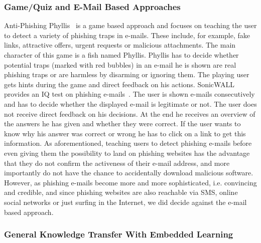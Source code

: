 \subsubsection{Game/Quiz and E-Mail Based Approaches}
Anti-Phishing Phyllis~\cite{antiphishingphyllis} is a game based approach and focuses on teaching the user to detect a variety of phishing traps in e-mails. 
These include, for example, fake links, attractive offers, urgent requests or malicious attachments. 
The main character of this game is a fish named Phyllis. 
Phyllis has to decide whether potential traps (marked with red bubbles) in an e-mail he is shown are real phishing traps or are harmless by disarming or ignoring them. 
The playing user gets hints during the game and direct feedback on his actions. 
SonicWALL provides an IQ test on phishing e-mails~\cite{sonicwall}. 
The user is shown e-mails consecutively and has to decide whether the displayed e-mail is legitimate or not. 
The user does not receive direct feedback on his decisions. 
At the end he receives an overview of the answers he has given and whether they were correct. 
If the user wants to know why his answer was correct or wrong he has to click on a link to get this information. 
As aforementioned, teaching users to detect phishing e-mails before even giving them the possibility to land on phishing websites has the advantage that they do not confirm the activeness of their e-mail address, and more importantly do not have the chance to accidentally download malicious software. 
However, as phishing e-mails become more and more sophisticated, i.e. convincing and credible, and since phishing websites are also reachable via SMS, online social networks or just surfing in the Internet, we did decide against the e-mail based approach. 

\subsubsection{General Knowledge Transfer With Embedded Learning}

